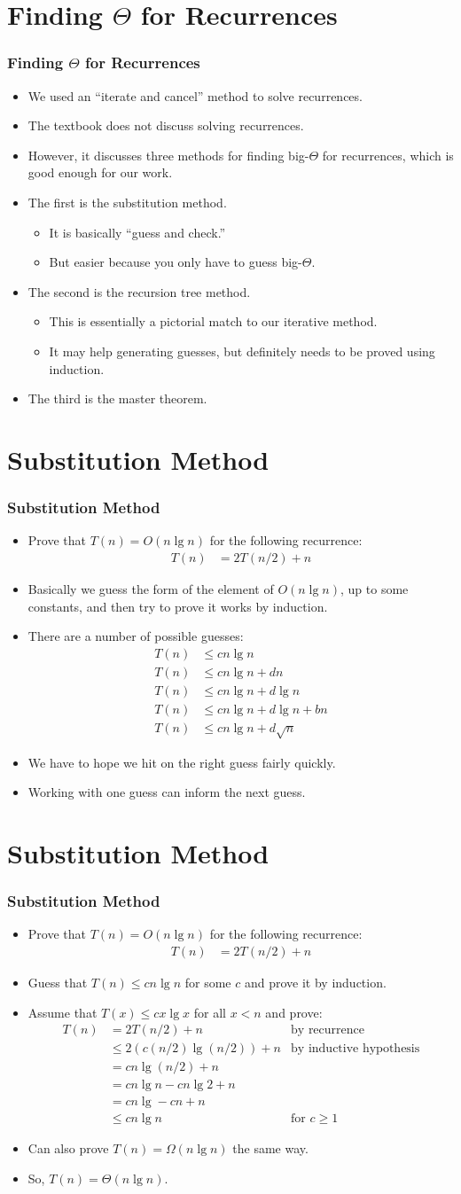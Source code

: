 \documentclass{beamer}
\newcommand{\sect}[1]{
\section{#1}
\begin{frame}[fragile]\frametitle{#1}
}
\newcommand{\bi}{\begin{itemize}}
\newcommand{\ii}{\item}
\newcommand{\ei}{\end{itemize}}
\begin{document}
\sect{Finding $\Theta$ for Recurrences}

\bi
\ii We used an ``iterate and cancel'' method to solve recurrences.
\ii The textbook does not discuss solving recurrences.
\ii However, it discusses three methods for finding big-$\Theta$ for
recurrences, which is good enough for our work.
\ii The first is the substitution method.
\bi
\ii It is basically ``guess and check.''
\ii But easier because you only have to guess big-$\Theta$.
\ei
\ii The second is the recursion tree method.
\bi
\ii This is essentially a pictorial match to our iterative method.
\ii It may help generating guesses, but definitely needs to be proved
using induction.
\ei
\ii The third is the master theorem.
\ei

\end{frame}

\sect{Substitution Method}
\bi
\ii
Prove that $T(n) = O(n\lg n)$ for the following recurrence:
\begin{align*}
T(n) &= 2T(n/2) + n
\end{align*}
\ii
Basically we guess the form of the element of
$O(n\lg n)$, up to some constants,
and then try to prove it works by induction.
\ii
There are a number of possible guesses:
\begin{align*}
  T(n) &\leq cn\lg n\\
  T(n) &\leq cn\lg n + dn\\
  T(n) &\leq cn\lg n + d\lg n\\
  T(n) &\leq cn\lg n + d\lg n + b n\\
  T(n) &\leq cn\lg n + d\sqrt{n}
\end{align*}
\ii
We have to hope we hit on the right guess fairly quickly.
\ii
Working with one guess can inform the next guess.
\ei

\end{frame}

\sect{Substitution Method}
\bi
\ii
Prove that $T(n) = O(n\lg n)$ for the following recurrence:
\begin{align*}
T(n) &= 2T(n/2) + n
\end{align*}
\ii
Guess that $T(n) \leq cn\lg n$ for some $c$ and prove it by induction.
\ii
Assume that $T(x) \leq cx\lg x$ for all $x < n$ and prove:
\begin{align*}
  T(n) &= 2T(n/2) + n & \mbox{by recurrence}\\
  &\leq 2(c(n/2)\lg(n/2)) + n &\mbox{by inductive hypothesis}\\
  &= cn\lg(n/2) + n\\
  &= cn\lg n -cn\lg 2 + n\\
  &= cn\lg - cn + n\\
  &\leq cn\lg n &\mbox{for $c \geq 1$}
\end{align*}
\ii
Can also prove $T(n) = \Omega(n\lg n)$ the same way.
\ii
So, $T(n) = \Theta(n \lg n)$.
\ei
\end{frame}
\end{document}

